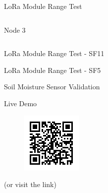 \documentclass{beamer}
\begin{document}
\begin{frame}{LoRa Module Range Test}
\begin{columns}[T]
\begin{column}{.3\textwidth}
\begin{figure}
    \end{figure}
    \vspace{-1em}
    Node 3
\end{column}
\end{columns}
\end{frame}


\begin{frame}{LoRa Module Range Test - SF11}
\begin{figure}
    
\end{figure}
\begin{figure}
    
\end{figure}
\end{frame}

\begin{frame}{LoRa Module Range Test - SF5}
\begin{figure}
    
\end{figure}
\begin{figure}
    
\end{figure}
\end{frame}


\begin{frame}{Soil Moisture Sensor Validation}
\begin{figure}
    
\end{figure}
\end{frame}


\begin{frame}{Live Demo}
\begin{figure}
    \centering
    \includegraphics[width=.5\linewidth]{img/qr.png}
\end{figure}
\begin{center}
    (or visit the link)
\end{center}
\end{frame}
\end{document}
